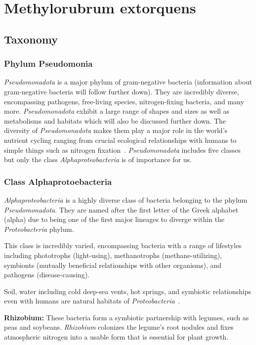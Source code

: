 \section{Methylorubrum extorquens}


\subsection{Taxonomy\authorB{}}

\subsubsection{Phylum Pseudomonia}
\emph{Pseudomonadota} is a major phylum of gram-negative bacteria (information about gram-negative bacteria will follow further down).
They are incredibly diverse, encompassing
pathogens, free-living species, nitrogen-fixing bacteria, and many more.
\emph{Pseudomonadota} exhibit a large range of shapes and sizes as well as metabolisms and
habitats which will also be discussed further down.
The diversity of \emph{Pseudomonadota} makes them play a major role in the world's nutrient cycling ranging from crucial ecological relationships with humans to simple things such as nitrogen fixation~\cite{pseudomonadota}.
\emph{Pseudomonadota} includes five classes but only the class \emph{Alphaproteobacteria} is of importance for us.

\subsubsection{Class Alphaprotoebacteria}
\emph{Alphaproteobacteria} is a highly diverse class of bacteria belonging to the phylum \emph{Pseudomonadota}.
They are named after the first letter of the Greek alphabet (alpha) due to being one of the first major lineages to diverge within the \emph{Proteobacteria} phylum.

This class is incredibly varied, encompassing bacteria with a range of lifestyles including phototrophs (light-using), methanotrophs (methane-utilizing), symbionts (mutually beneficial relationships with other organisms), and pathogens (disease-causing).

Soil, water including cold deep-sea vents, hot springs, and symbiotic relationships even
with humans are natural habitats of \emph{Proteobacteria}~\cite{gammaproteobacteria}.

\textbf{Rhizobium:} These bacteria form a symbiotic partnership with legumes, such as peas and soybeans.
\emph{Rhizobium} colonizes the legume's root nodules and fixes atmospheric nitrogen into a usable form that is essential for plant growth.

